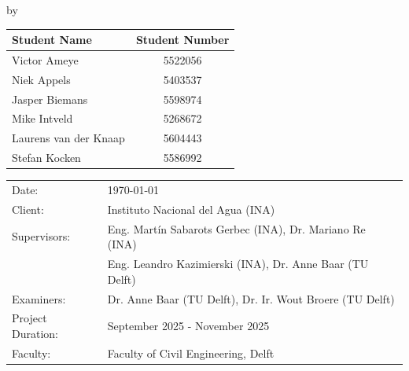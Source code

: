 \begin{titlepage}

\begin{center}

{\makeatletter
\largetitlestyle\fontsize{45}{45}\selectfont\@title
\makeatother}

{\makeatletter
\ifdefvoid{\@subtitle}{}{\bigskip\titlestyle\fontsize{20}{20}\selectfont\@subtitle}
\makeatother}

\bigskip
\bigskip

by

\bigskip
\bigskip

{\makeatletter
\largetitlestyle\fontsize{25}{25}\selectfont\@author
\makeatother}

\bigskip
\bigskip

\setlength\extrarowheight{2pt}
\begin{tabular}{lc}
    Student Name & Student Number \\\midrule
    Victor Ameye & 5522056 \\
    Niek Appels & 5403537 \\
    Jasper Biemans & 5598974 \\
    Mike Intveld & 5268672 \\
    Laurens van der Knaap & 5604443 \\
    Stefan Kocken & 5586992 \\    
\end{tabular}

\vfill

\begin{tabular}{ll}
    Date: & \today \\
    Client: & Instituto Nacional del Agua (INA) \\
    Supervisors: & Eng. Martín Sabarots Gerbec (INA), Dr. Mariano Re (INA) \\ 
                 & Eng. Leandro Kazimierski (INA), Dr. Anne Baar (TU Delft) \\
    Examiners: & Dr. Anne Baar (TU Delft), Dr. Ir. Wout Broere (TU Delft) \\
    Project Duration: & September 2025 - November 2025 \\
    Faculty: & Faculty of Civil Engineering, Delft
\end{tabular}

\bigskip
\bigskip


\end{center}
\end{titlepage}
